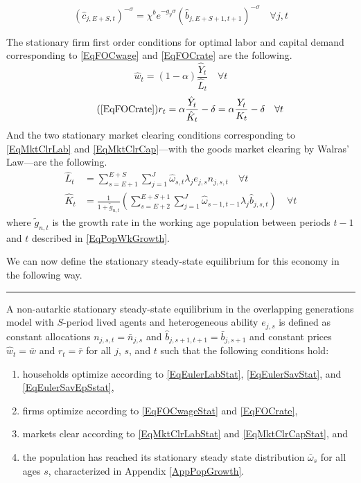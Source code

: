 \begin{spacing}{1.5}
    \begin{equation}\label{EqEulerSavEpSstat}
      (\hat{c}_{j,E+S,t})^{-\sigma} = \chi^b e^{-g_y\sigma}(\hat{b}_{j,E+S+1,t+1})^{-\sigma} \quad\forall j,t
    \end{equation}

    The stationary firm first order conditions for optimal labor and capital demand corresponding to \eqref{EqFOCwage} and \eqref{EqFOCrate} are the following.
    \begin{equation}\label{EqFOCwageStat}
       \hat{w}_t = (1-\alpha)\frac{\hat{Y}_t}{\hat{L}_t} \quad \forall t
    \end{equation}
    \begin{equation}\tag{\ref{EqFOCrate}}
       r_t = \alpha\frac{\hat{Y}_t}{\hat{K}_t} - \delta = \alpha\frac{Y_t}{K_t} - \delta \quad \forall t
    \end{equation}
    And the two stationary market clearing conditions corresponding to \eqref{EqMktClrLab} and \eqref{EqMktClrCap}---with the goods market clearing by Walras' Law---are the following.
    \begin{align}
      \hat{L}_t &= \sum_{s=E+1}^{E+S}\sum_{j=1}^{J} \hat{\omega}_{s,t}\lambda_j e_{j,s}n_{j,s,t} \quad \forall t \label{EqMktClrLabStat} \\
      \hat{K}_t &= \frac{1}{1 + \tilde{g}_{n,t}}\left(\sum_{s=E+2}^{E+S+1}\sum_{j=1}^{J}\hat{\omega}_{s-1,t-1}\lambda_j \hat{b}_{j,s,t}\right) \quad \forall t \label{EqMktClrCapStat}
    \end{align}
    where $\tilde{g}_{n,t}$ is the growth rate in the working age population between periods $t-1$ and $t$ described in \eqref{EqPopWkGrowth}.

    We can now define the stationary steady-state equilibrium for this economy in the following way.

    \vspace{7mm}
    \end{spacing}
    \hrule
    \begin{definition}\label{DefEquilSS}
      A non-autarkic stationary steady-state equilibrium in the overlapping generations model with $S$-period lived agents and heterogeneous ability $e_{j,s}$ is defined as constant allocations $n_{j,s,t}=\bar{n}_{j,s}$ and $\hat{b}_{j,s+1,t+1}=\bar{b}_{j,s+1}$ and constant prices $\hat{w}_t=\bar{w}$ and $r_t=\bar{r}$ for all $j$, $s$, and $t$ such that the following conditions hold:
       \begin{enumerate}
          \item households optimize according to \eqref{EqEulerLabStat}, \eqref{EqEulerSavStat}, and \eqref{EqEulerSavEpSstat},
          \item firms optimize according to \eqref{EqFOCwageStat} and \eqref{EqFOCrate},
          \item markets clear according to \eqref{EqMktClrLabStat} and \eqref{EqMktClrCapStat}, and
          \item the population has reached its stationary steady state distribution $\bar{\omega}_s$ for all ages $s$, characterized in Appendix \ref{AppPopGrowth}.
       \end{enumerate}
    \end{definition}
